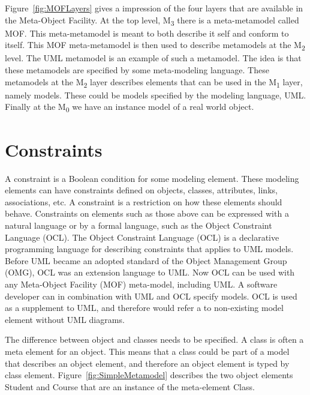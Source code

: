 Figure~\ref{fig:MOFLayers} gives a impression of the four layers that are
available in the Meta-Object Facility. At the top level, M\textsubscript{3}
there is a meta-metamodel called MOF. This meta-metamodel is meant to both
describe it self and conform to itself. This MOF meta-metamodel is then used to
describe metamodels at the M\textsubscript{2} level. The UML metamodel is an
example of such a metamodel. The idea is that these metamodels are specified by
some meta-modeling language. These metamodels at the M\textsubscript{2} layer
describes elements that can be used in the M\textsubscript{1} layer, namely
models. These could be models specified by the modeling language, UML. Finally
at the M\textsubscript{0} we have an instance model of a real world object. 


 




 
\section{Constraints}

A constraint is a Boolean condition for some modeling element. These modeling
elements can have constraints defined on objects, classes, attributes,
links, associations, etc. A constraint is a restriction on how these
elements should behave. Constraints on elements such as those above can be
expressed with a natural language or by a formal language, such as the
Object Constraint Language\cite{OCL} (OCL). The Object Constraint Language (OCL)
is a declarative programming language for describing constraints that applies to
UML models. Before UML became an adopted standard of the Object Management Group
(OMG), OCL was an extension language to UML. Now OCL can be used with any
Meta-Object Facility (MOF) meta-model, including UML. A software developer
can in combination with UML and OCL specify models. OCL is used as a supplement
to UML, and therefore would refer a to non-existing model element without UML
diagrams\cite{Warmer:2003:OCL:861416}.

The difference between object and classes needs to be specified. A class
is often a meta element for an object. This means that a class could be part of
a model that describes an object element, and therefore an object element is
typed by class element\cite{OO_UML}. Figure~\ref{fig:SimpleMetamodel} describes
the two object elements Student and Course that are an instance of the
meta-element Class.

